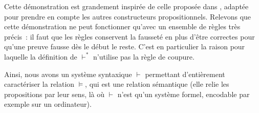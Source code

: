 \begin{remark}
  Cette démonstration est grandement inspirée de celle proposée dans
  \cite{belghiti2016clefs}, adaptée pour prendre en compte les autres
  constructeurs propositionnels. Relevons que cette démonstration ne peut
  fonctionner qu'avec un ensemble de règles très précis~: il faut que les règles
  conservent la fausseté en plus d'être correctes pour qu'une preuve fausse dès
  le début le reste. C'est en particulier la raison pour laquelle la définition
  de $\vdash^*$ n'utilise pas la règle de coupure.
\end{remark}

Ainsi, nous avons un système syntaxique $\vdash$ permettant d'entièrement
caractériser la relation $\vDash$, qui est une relation sémantique (elle relie
les propositions par leur sens, là où $\vdash$ n'est qu'un système formel,
encodable par exemple sur un ordinateur).
